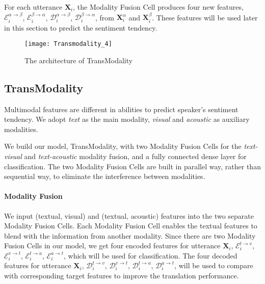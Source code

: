 \documentclass[sigconf]{acmart}
\begin{document}
	For each utterance $\mathbf{X}_i$, the Modality Fusion Cell produces four new features, $\mathcal{E}^{\alpha \to \beta}_i$, $\mathcal{E}^{\beta \to \alpha}_i$, $\mathcal{D}^{\alpha \to \beta}_i$, $\mathcal{D}^{\beta \to \alpha}_i$, from $\mathbf{X}^{\alpha}_i$ and $\mathbf{X}^{\beta}_i$. These features will be used later in this section to predict the sentiment tendency.
	\begin{figure}[t]
		\centering
		\texttt{[image: Transmodality\_4]}
		\caption{The architecture of TransModality}
		\label{fig:transmodality}
	\end{figure}

	\subsection{TransModality}
	Multimodal features are different in abilities to predict speaker's sentiment tendency. We adopt \textit{text} as the main modality, \textit{visual} and \textit{acoustic} as auxiliary modalities.
	
	We build our model, TransModality, with two Modality Fusion Cells for the \textit{text-visual} and \textit{text-acoustic} modality fusion, and a fully connected dense layer for classification. The two Modality Fusion Cells are built in parallel way, rather than sequential way, to eliminate the interference between modalities.
	
	\paragraph{Modality Fusion}
	We input (textual, visual) and (textual, acoustic) features into the two separate Modality Fusion Cells. Each Modality Fusion Cell enables the textual features to blend with the information from another modality. Since there are two Modality Fusion Cells in our model, we get four encoded features for utterance $\mathbf{X}_i$, $\mathcal{E}^{t \to v}_i$, $\mathcal{E}^{v \to t}_i$, $\mathcal{E}^{t \to a}_i$, $\mathcal{E}^{a \to t}_i$, which will be used for classification. The four decoded features for utterance $\mathbf{X}_i$, $\mathcal{D}^{t \to v}_i$, $\mathcal{D}^{v \to t}_i$, $\mathcal{D}^{t \to a}_i$, $\mathcal{D}^{a \to t}_i$, will be used to compare with corresponding target features to improve the translation performance.
	
\end{document}
